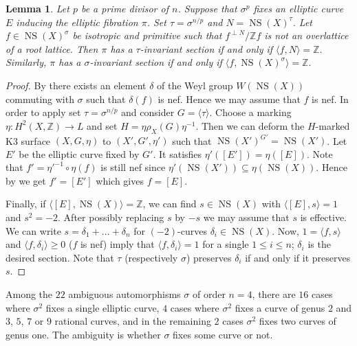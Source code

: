 \documentclass[a4paper]{amsart}
\theoremstyle{definition}
\theoremstyle{plain}
\newtheorem{lemma}[definition]{Lemma}
\DeclareMathOperator{\NS}{NS}
\newcommand{\ZZ}{\mathbb{Z}}
\begin{document}
\begin{lemma}\label{hassection}
 Let $p$ be a prime divisor of $n$. Suppose that $\sigma^p$ fixes an elliptic curve $E$ inducing the elliptic fibration $\pi$. Set $\tau=\sigma^{n/p}$ and $N= \NS(X)^{\tau}$.
 Let $f\in \NS(X)^\sigma$ be isotropic and primitive such that $f^{\perp N}/\ZZ f$ is not an overlattice of a root lattice.
 Then $\pi$ has a $\tau$-invariant section if and only if $\langle f, N \rangle = \ZZ$.
 Similarly, $\pi$ has a $\sigma$-invariant section if and only if $\langle f ,\NS(X)^\sigma \rangle=\ZZ$.
\end{lemma}
\begin{proof}
By \cite[Lemma 1.7 and Theorem 1.8]{oguiso-sakurai} there exists an element $\delta$ of the  Weyl group $W(\NS(X))$ commuting with $\sigma$ such that $\delta(f)$ is nef. Hence we may assume  that $f$ is nef.
In order to apply  set $\tau = \sigma^{n/p}$ and consider $G=\langle \tau \rangle$. Choose a marking $\eta\colon H^2(X,\ZZ)\to L$ and set $H= \eta\rho_X(G) \eta^{-1}$. Then we can deform the $H$-marked K3 surface $(X,G,\eta)$ to $(X',G',\eta')$ such that
$\NS(X')^{G'} = \NS(X')$. Let $E'$ be the elliptic curve fixed by $G'$. It satisfies $\eta'([E']) = \eta([E])$. Note that $f' = \eta'^{-1} \circ \eta(f)$ is still nef since $\eta'(\NS(X'))\subseteq \eta(\NS(X))$.
Hence by  we get $f'= [E']$ which gives $f = [E]$.

Finally, if $\langle [E], \NS(X)\rangle = \ZZ$, we can find $s \in \NS(X)$ with $\langle [E],s\rangle=1$ and $s^2=-2$. After possibly replacing $s$ by $-s$ we may assume that $s$ is effective.
We can write $s = \delta_1 + \dots + \delta_n$ for $(-2)$-curves $\delta_i \in \NS(X)$. Now, $1=\langle f , s \rangle$ and $\langle f, \delta_i \rangle \geq 0$ ($f$ is nef) imply that $\langle f , \delta_i \rangle =1$ for a single $1\leq i \leq n $; $\delta_i$ is the desired section. Note that $\tau$ (respectively $\sigma$) preserves $\delta_i$ if and only if it preserves $s$.
\end{proof}
%
%

Among the $22$ ambiguous automorphisms $\sigma$ of order $n=4$, there are $16$ cases where $\sigma^2$ fixes a single elliptic curve,
$4$ cases where $\sigma^2$ fixes a curve of genus $2$ and $3$, $5$, $7$ or $9$ rational curves, and in the remaining $2$ cases $\sigma^2$ fixes two curves of genus one.
The ambiguity is whether $\sigma$ fixes some curve or not.
\end{document}
